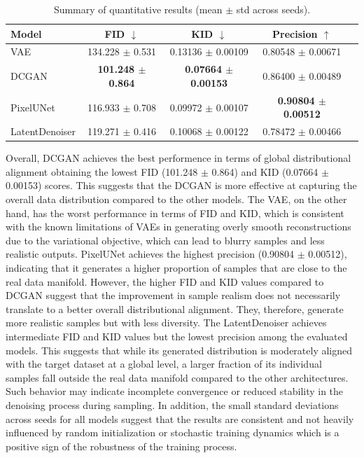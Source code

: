 \documentclass[runningheads]{llncs}
\begin{document}
\begin{table}[H]
    \centering
    \caption{Summary of quantitative results (mean $\pm$ std across seeds).}
    \label{tab:summary_results}
    \begin{tabular}{lcccc}
        \toprule
        \textbf{Model} & \textbf{FID $\downarrow$} & \textbf{KID $\downarrow$} & \textbf{Precision $\uparrow$} & \\
        \midrule
        VAE & 134.228 $\pm$ 0.531 & 0.13136 $\pm$ 0.00109 & 0.80548 $\pm$ 0.00671\\
        DCGAN & \textbf{101.248 $\pm$ 0.864} & \textbf{0.07664 $\pm$ 0.00153} & 0.86400 $\pm$ 0.00489 \\
        PixelUNet & 116.933 $\pm$ 0.708 & 0.09972 $\pm$ 0.00107 & \textbf{0.90804 $\pm$ 0.00512} \\
        LatentDenoiser & 119.271 $\pm$ 0.416 & 0.10068 $\pm$ 0.00122 & 0.78472 $\pm$ 0.00466 \\
        \bottomrule
    \end{tabular}
\end{table}

Overall, DCGAN achieves the best performence in terms of 
global distributional alignment obtaining the lowest FID (101.248 $\pm$ 0.864)
and KID (0.07664 $\pm$ 0.00153) scores. This suggests that the DCGAN is more effective at 
capturing the overall data distribution compared to the other models. The VAE, on the 
other hand, has the worst performance in terms of FID and KID, 
which is consistent with the known limitations of VAEs in generating overly
smooth reconstructions due to the variational objective, which
can lead to blurry samples and less realistic outputs.
PixelUNet achieves the highest precision (0.90804 $\pm$ 0.00512), indicating 
that it generates a higher proportion of samples that are close to the 
real data manifold. However, the higher FID and KID values
compared to DCGAN suggest that the improvement in sample realism 
does not necessarily translate to a better overall distributional alignment.
They, therefore, generate more realistic samples but with less diversity.
The LatentDenoiser achieves intermediate FID and KID values but the 
lowest precision among the evaluated models. This suggests that while 
its generated distribution is moderately aligned with the target dataset 
at a global level, a larger fraction of its individual samples fall outside 
the real data manifold compared to the other architectures. Such behavior may 
indicate incomplete convergence or reduced stability in the denoising process 
during sampling. In addition, the small standard deviations across seeds for all 
models suggest that the results are consistent and not heavily influenced by
random initialization or stochastic training dynamics which is a positive sign of the 
robustness of the training process.
\end{document}
